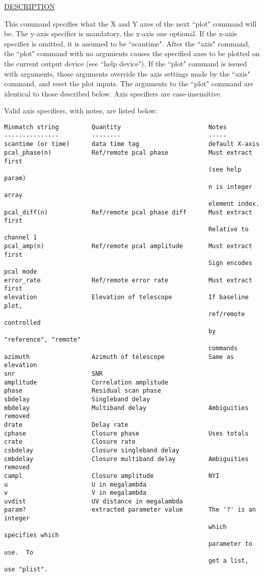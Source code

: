 \underline{DESCRIPTION}
\begin{list}{}{\setlength{\leftmargin}{0.5in}
     \setlength{\rightmargin}{0in}}
\item
This command specifies what the X and Y axes of the next ``plot" command
will be.  The y-axis specifier is mandatory, the x-axis one optional.  If
the x-axis specifier is omitted, it is assumed to be ``scantime".  After
the ``axis" command, the ``plot" command with no arguments causes the specified
axes to be plotted on the current output device (see ``help device").  If
the ``plot" command is issued with arguments, those arguments override the
axis settings made by the ``axis" command, and reset the plot inputs.  The
arguments to the ``plot" command are identical to those described below.
Axis specifiers are case-insensitive.
\item
Valid axis specifiers, with notes, are listed below:
\item
\begin{verbatim}
Minmatch string         Quantity                        Notes
---------------         --------                        -----
scantime (or time)      data time tag                   default X-axis
pcal_phase(n)           Ref/remote pcal phase           Must extract first
                                                        (see help param)
                                                        n is integer array
                                                        element index.
pcal_diff(n)            Ref/remote pcal phase diff      Must extract first
                                                        Relative to channel 1
pcal_amp(n)             Ref/remote pcal amplitude       Must extract first
                                                        Sign encodes pcal mode
error_rate              Ref/remote error rate           Must extract first
elevation               Elevation of telescope          If baseline plot, 
                                                        ref/remote controlled
                                                        by "reference", "remote"
                                                        commands
azimuth                 Azimuth of telescope            Same as elevation
snr                     SNR
amplitude               Correlation amplitude
phase                   Residual scan phase
sbdelay                 Singleband delay
mbdelay                 Multiband delay                 Ambiguities removed
drate                   Delay rate
cphase                  Closure phase                   Uses totals
crate                   Closure rate
csbdelay                Closure singleband delay
cmbdelay                Closure multiband delay         Ambiguities removed
campl                   Closure amplitude               NYI
u                       U in megalambda 
v                       V in megalambda 
uvdist                  UV distance in megalambda
param?                  extracted parameter value       The '?' is an integer
                                                        which specifies which
                                                        parameter to use.  To
                                                        get a list, use "plist".
\end{verbatim}
\end{list}
